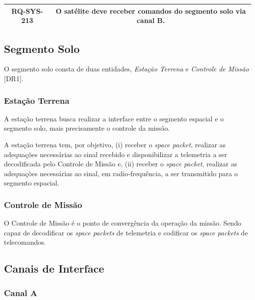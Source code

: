 \begin{table}[H]
    \centering
    \begin{tabular}{|c|c|}
        \hline
        \rowcolor{orange}
        \textbf{RQ-SYS-213} & \textbf{O satélite deve receber comandos do segmento solo via canal B.} \\ \hline
    \end{tabular}
    \label{tab:rq-sys-103}
\end{table}

\subsection{Segmento Solo}

O segmento solo consta de duas entidades, \textit{Estação Terrena} e \textit{Controle de Missão} [DR1].

\subsubsection{Estação Terrena}

A estação terrena busca realizar a interface entre o segmento espacial e o segmento solo, mais precisamente o controle da missão.

A estação terrena tem, por objetivo, (i) receber o \textit{space packet}, realizar as adequações necessárias ao sinal recebido e disponibilizar a telemetria a ser decodificada pelo Controle de Missão e, (ii) receber o \textit{space packet}, realizar as adequações necessárias ao sinal, em radio-frequência, a ser transmitido para o segmento espacial.

\subsubsection{Controle de Missão}

O Controle de Missão é o ponto de convergência da operação da missão.
Sendo capaz de decodificar os \textit{space packets} de telemetria e codificar os \textit{space packets} de telecomandos.

\subsection{Canais de Interface}

\subsubsection{Canal A}

